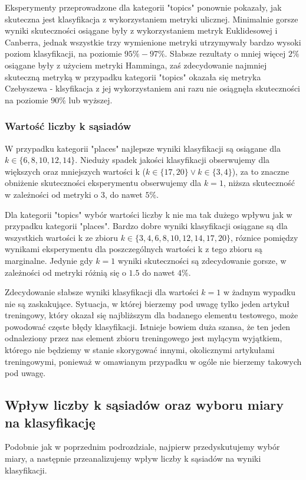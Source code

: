\documentclass{classrep}
\begin{document}
Eksperymenty przeprowadzone dla kategorii "topics" ponownie pokazały, jak skuteczna jest klasyfikacja z wykorzystaniem metryki ulicznej. Minimalnie gorsze wyniki skuteczności osiągane były z wykorzystaniem metryk Euklidesowej i Canberra, jednak wszystkie trzy wymienione metryki utrzymywały bardzo wysoki poziom klasyfikacji, na poziomie $95\%-97\%$. Słabsze rezultaty o mniej więcej $2\%$ osiągane były z użyciem metryki Hamminga, zaś zdecydowanie najmniej skuteczną metryką w przypadku kategorii "topics" okazała się metryka Czebyszewa - klsyfikacja z jej wykorzystaniem ani razu nie osiągnęła skuteczności na poziomie $90\%$ lub wyższej. \newline

\subsubsection{Wartość liczby k sąsiadów}
W przypadku kategorii "places" najlepsze wyniki klasyfikacji są osiągane dla $k \in \{6, 8, 10, 12, 14\}$. Nieduży spadek jakości klasyfikacji obserwujemy dla większych oraz mniejszych wartości k ($k\in \{17, 20\} \lor k \in \{3, 4\}$), za to znaczne obniżenie skuteczności eksperymentu obserwujemy dla $k=1$, niższa skuteczność w zależności od metryki o 3, do nawet $5\%$. \newline

Dla kategorii "topics" wybór wartości liczby k nie ma tak dużego wpływu jak w przypadku kategorii "places". Bardzo dobre wyniki klasyfikacji osiągane są dla wszystkich wartości k ze zbioru $k \in \{3, 4, 6, 8, 10, 12, 14, 17, 20\}$, róznice pomiędzy wynikami eksperymentu dla poszczególnych wartości k z tego zbioru są marginalne. Jedynie gdy $k=1$ wyniki skuteczności są zdecydowanie gorsze, w zależności od metryki różnią się o $1.5$ do nawet $4\%$. \newline

Zdecydowanie słabsze wyniki klasyfikacji dla wartości $k=1$ w żadnym wypadku nie są zaskakujące. Sytuacja, w której bierzemy pod uwagę tylko jeden artykuł treningowy, który okazał się najbliższym dla badanego elementu testowego, może powodować częste błędy klasyfikacji. Istnieje bowiem duża szansa, że ten jeden odnaleziony przez nas element zbioru treningowego jest mylącym wyjątkiem, którego nie będziemy w stanie skorygować innymi, okolicznymi artykułami treningowymi, ponieważ w omawianym przypadku w ogóle nie bierzemy takowych pod uwagę.

\subsection{Wpływ liczby k sąsiadów oraz wyboru miary na klasyfikację}
Podobnie jak w poprzednim podrozdziale, najpierw przedyskutujemy wybór miary, a następnie przeanalizujemy wpływ liczby k sąsiadów na wyniki klasyfikacji.
\end{document}
